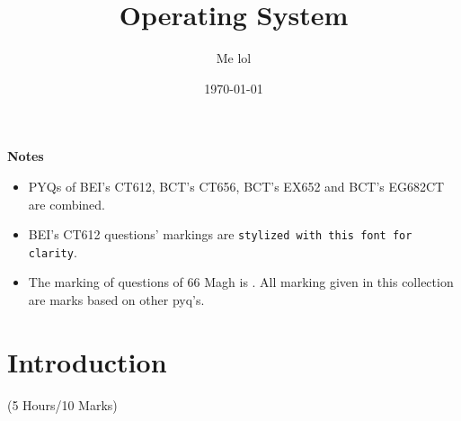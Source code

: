 \documentclass[12pt]{article}
\title{Operating System}
\author{Me lol}
\date{\today}
\begin{document}
\maketitle
\vspace{13cm}
\begin{large}\textbf{Notes}\end{large}
\begin{itemize}
\item PYQs of BEI's CT612, BCT's CT656, BCT's EX652 and BCT's EG682CT are combined.
\item BEI's CT612 questions' markings are \texttt{stylized with this font for clarity}.
\item The marking of questions of 66 Magh is  . All marking given in this collection are  marks based on other pyq's. 
\end{itemize}
\pagebreak
\tableofcontents
\pagebreak

\section{Introduction}
\begin{center}(5 Hours/10 Marks)\end{center}
\end{document}
